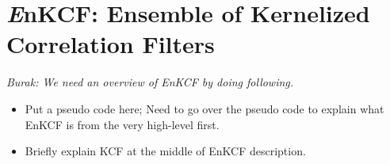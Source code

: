 \documentclass[10pt,twocolumn,letterpaper]{article}
\newcounter{ct}
\begin{document}
\section{{\it E}nKCF: Ensemble of Kernelized Correlation Filters}

{\it Burak: We need an overview of EnKCF by doing following.}
\begin{itemize}
\item Put a pseudo code here; Need to go over the pseudo code to explain what EnKCF is from the very high-level first.
\item Briefly explain KCF at the middle of EnKCF description.
\end{itemize}

\end{document}

